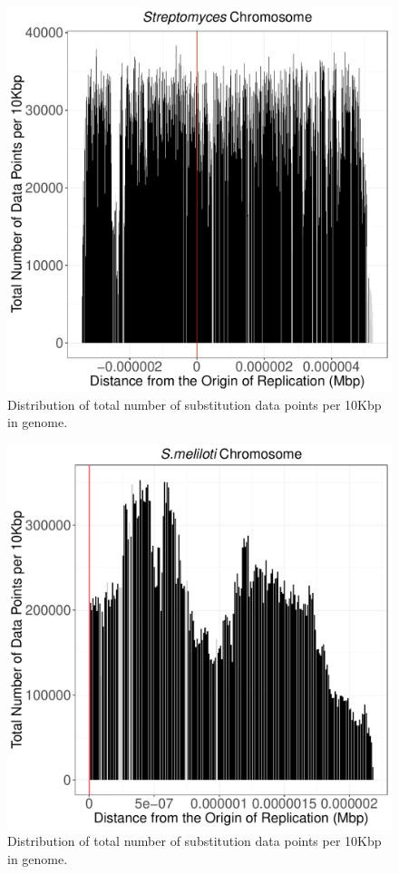 \documentclass[12pt]{article}
\begin{document}
\begin{figure}
	\includegraphics[width=0.9\linewidth]{./strep_total_num_sites_graph.pdf}
	\caption{\label{fig:strep_tot_sites} Distribution of total number of substitution  data points per 10Kbp in genome.}
\end{figure}

\begin{figure}
	\includegraphics[width=0.9\linewidth]{./sinoC_total_num_sites_graph.pdf}
	\caption{\label{fig:sinoC_tot_sites} Distribution of total number of substitution data points per 10Kbp in genome.}
\end{figure}
\end{document}
